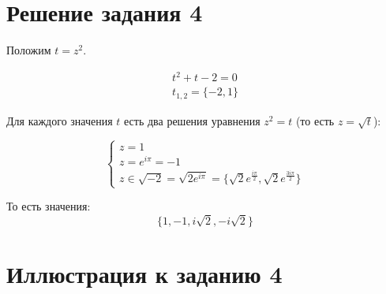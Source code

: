\documentclass[12pt, a4paper]{article}
\begin{document}
    \section{Решение задания 4}
    Положим $t = z^2$.

    \begin{gather}
        t^2 + t - 2 = 0 \\
        t_{1, 2} = \{-2, 1\}
    \end{gather}

    Для каждого значения $t$ есть два решения уравнения $z^2 = t$ (то есть $z = \sqrt{t}$):

    \begin{equation}
        \begin{cases}
            z = 1 \\
            z = e^{i \pi} = -1 \\
            z \in \sqrt{-2} = \sqrt{2 e^{i \pi}} = \{ \sqrt{2} e^{\frac{i\pi}{2}}, \sqrt{2} e^{\frac{3i\pi}{2}} \}
        \end{cases}
    \end{equation}

    То есть значения:
    \begin{equation}
        \{ 1, -1, i\sqrt{2}, -i\sqrt{2} \}
    \end{equation}


    \section{Иллюстрация к заданию 4}
    



    
\end{document}

